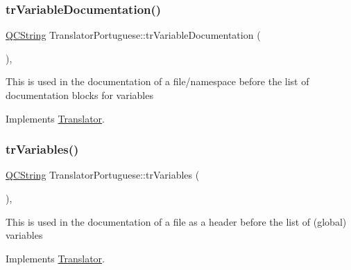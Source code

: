 \mbox{\label{class_translator_portuguese_a20cc092c5f3ceeb96718275d57bf807c}} 
\subsubsection{\texorpdfstring{trVariableDocumentation()}{trVariableDocumentation()}}
{\footnotesize\ttfamily \mbox{\hyperlink{class_q_c_string}{Q\+C\+String}} Translator\+Portuguese\+::tr\+Variable\+Documentation (\begin{DoxyParamCaption}{ }\end{DoxyParamCaption})\hspace{0.3cm}{\ttfamily [inline]}, {\ttfamily [virtual]}}

This is used in the documentation of a file/namespace before the list of documentation blocks for variables 

Implements \mbox{\hyperlink{class_translator}{Translator}}.

\mbox{\label{class_translator_portuguese_a7863f5711f87ec7863e5e77914cfa0d8}} 
\subsubsection{\texorpdfstring{trVariables()}{trVariables()}}
{\footnotesize\ttfamily \mbox{\hyperlink{class_q_c_string}{Q\+C\+String}} Translator\+Portuguese\+::tr\+Variables (\begin{DoxyParamCaption}{ }\end{DoxyParamCaption})\hspace{0.3cm}{\ttfamily [inline]}, {\ttfamily [virtual]}}

This is used in the documentation of a file as a header before the list of (global) variables 

Implements \mbox{\hyperlink{class_translator}{Translator}}.

\mbox{\label{class_translator_portuguese_a6026e4f3c598b15748761d53cc48914f}} 
